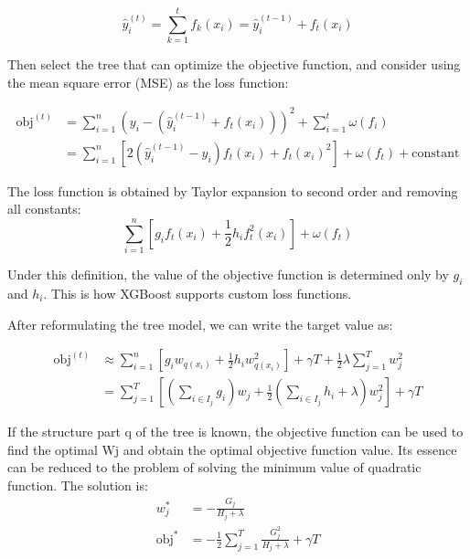 \documentclass[a4paper]{jpconf}
\begin{document}
\begin{equation}\label{eq:3}
\hat{y}_i^{(t)} = \sum_{k=1}^t f_k(x_i)= \hat{y}_i^{(t-1)} + f_t(x_i)
\end{equation}


Then select the tree that can optimize the objective function, and consider using the mean square error (MSE) as the loss function:

\begin{equation}\label{eq:origin}
\begin{split}\text{obj}^{(t)} & = \sum_{i=1}^n (y_i - (\hat{y}_i^{(t-1)} + f_t(x_i)))^2 + \sum_{i=1}^t\omega(f_i) \\
          & = \sum_{i=1}^n [2(\hat{y}_i^{(t-1)} - y_i)f_t(x_i) + f_t(x_i)^2] + \omega(f_t) + \mathrm{constant}\end{split}
\end{equation}

The loss function is obtained by Taylor expansion to second order and removing all constants:
\begin{equation}
\sum_{i=1}^n [g_i f_t(x_i) + \frac{1}{2} h_i f_t^2(x_i)] + \omega(f_t)
\end{equation}

Under this definition, the value of the objective function is determined only by $g_i$ and $h_i$. This is how XGBoost supports custom loss functions.


After reformulating the tree model, we can write the target value as:

\begin{equation}
\begin{split}\text{obj}^{(t)} &\approx \sum_{i=1}^n [g_i w_{q(x_i)} + \frac{1}{2} h_i w_{q(x_i)}^2] + \gamma T + \frac{1}{2}\lambda \sum_{j=1}^T w_j^2\\
&= \sum^T_{j=1} [(\sum_{i\in I_j} g_i) w_j + \frac{1}{2} (\sum_{i\in I_j} h_i + \lambda) w_j^2 ] + \gamma T\end{split}
\end{equation}

If the structure part q of the tree is known, the objective function can be used to find the optimal Wj and obtain the optimal objective function value. Its essence can be reduced to the problem of solving the minimum value of quadratic function. The solution is:
\begin{equation}
\begin{split}w_j^\ast &= -\frac{G_j}{H_j+\lambda}\\
\text{obj}^\ast &= -\frac{1}{2} \sum_{j=1}^T \frac{G_j^2}{H_j+\lambda} + \gamma T\end{split}
\end{equation}
\end{document}
